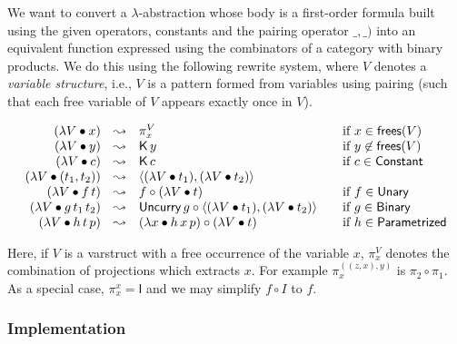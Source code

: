 \documentclass[11pt,a4paper]{article}
\def\Func#1{\mathsf{#1}}
\def\I{\Func{I}}
\def\K{\Func{K}}
\def\Uncurry{\Func{Uncurry}}
\def\Frees{\Func{frees}}
\def\Constant{\Func{Constant}}
\def\Unary{\Func{Unary}}
\def\Binary{\Func{Binary}}
\def\Parametrized{\Func{Parametrized}}
\begin{document}
We want to convert a $\lambda$-abstraction whose body is a first-order formula built using the given operators, constants and the pairing operator $\_, \_)$ into an equivalent function expressed using the combinators of a category with binary products.
We do this using the following rewrite system, where $V$ denotes a {\em variable structure}, i.e., $V$ is a pattern formed from variables using pairing (such that each free variable of $V$ appears exactly once in $V$).

\[
\begin{array}{rcl@{\quad\quad}l}
(\lambda V \bullet x) &\leadsto& \pi^V_x
	& \mbox{if $x \in \Frees(V)$} \\
(\lambda V \bullet y) &\leadsto& \K\,y
	& \mbox{if $y \not\in \Frees(V)$} \\
(\lambda V \bullet c) &\leadsto& \K\,c
	& \mbox{if $c \in \Constant$} \\
(\lambda V \bullet (t_1, t_2)) &\leadsto& \langle(\lambda V\bullet t_1), (\lambda V\bullet t_2)\rangle
	&  \\
(\lambda V \bullet f\,t) &\leadsto& f \circ (\lambda V\bullet t)
	& \mbox{if $f \in \Unary$} \\
(\lambda V \bullet g\,t_1\,t_2) &\leadsto& \Uncurry\,g \circ \langle(\lambda V\bullet t_1), (\lambda V\bullet t_2)\rangle
	& \mbox{if $g \in \Binary$} \\
(\lambda V \bullet h\,t\,p) &\leadsto& (\lambda x\bullet h\,x\,p) \circ (\lambda V\bullet t)
	& \mbox{if $h \in \Parametrized$} \\
\end{array}
\]

Here, if $V$ is a varstruct with a free occurrence of the variable $x$,
$\pi^V_x$ denotes the combination of projections which extracts $x$.
For example $\pi^{((z, x), y)}_x$ is $\pi_2 \circ \pi_1$.
As a special case, $\pi^x_x = \I$ and we may simplify $f \circ I$ to $f$.

\subsubsection{Implementation}
\end{document}
